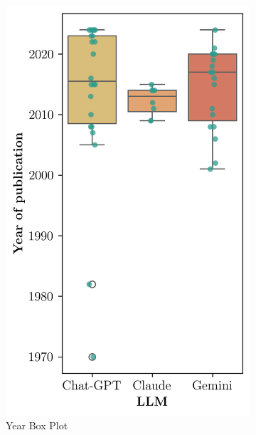 \documentclass[runningheads]{llncs}
\begin{document}
\begin{figure}[htbp]
    \centering
    \begin{subfigure}[b]{0.32\textwidth}
        \centering
        \includegraphics[width=\linewidth]{figures/years_box_plot.png}
        \caption{Year Box Plot}
        \label{fig:year_box_plot}
    \end{subfigure}
    \begin{subfigure}[b]{0.32\textwidth}
        \centering

\end{subfigure}
\end{figure}
\end{document}
